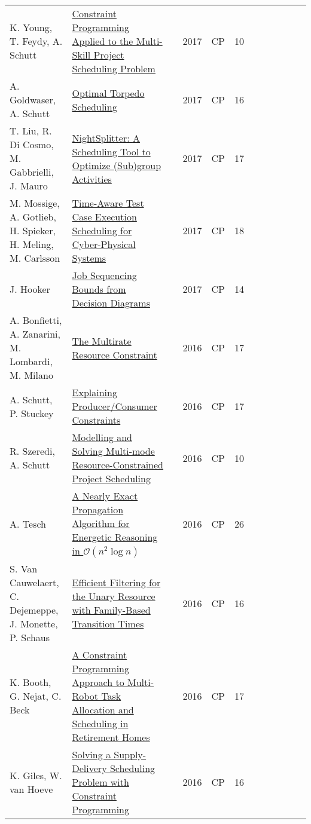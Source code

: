 {\begin{longtable}{p{3cm}p{6cm}rrcrlcccp{1.5cm}l}
K. Young, T. Feydy, A. Schutt& \href{papers/YoungFS17.pdf}{Constraint Programming Applied to the Multi-Skill Project Scheduling Problem} & \cite{YoungFS17} & 2017 & CP & 10 & & & & & & \\
A. Goldwaser, A. Schutt& \href{papers/GoldwaserS17.pdf}{Optimal Torpedo Scheduling} & \cite{GoldwaserS17} & 2017 & CP & 16 & & & & & & \\
T. Liu, R. Di Cosmo, M. Gabbrielli, J. Mauro& \href{papers/LiuCGM17.pdf}{NightSplitter: {A} Scheduling Tool to Optimize (Sub)group Activities} & \cite{LiuCGM17} & 2017 & CP & 17 & & & & & & \\
M. Mossige, A. Gotlieb, H. Spieker, H. Meling, M. Carlsson& \href{papers/MossigeGSMC17.pdf}{Time-Aware Test Case Execution Scheduling for Cyber-Physical Systems} & \cite{MossigeGSMC17} & 2017 & CP & 18 & & & & & & \\
J. Hooker & \href{papers/Hooker17.pdf}{Job Sequencing Bounds from Decision Diagrams} & \cite{Hooker17} & 2017 & CP & 14 & & & & & & \\
A. Bonfietti, A. Zanarini, M. Lombardi, M. Milano& \href{papers/BonfiettiZLM16.pdf}{The Multirate Resource Constraint} & \cite{BonfiettiZLM16} & 2016 & CP & 17 & & & & & & \\
A. Schutt, P. Stuckey& \href{papers/SchuttS16.pdf}{Explaining Producer/Consumer Constraints} & \cite{SchuttS16} & 2016 & CP & 17 & & & & & & \\
R. Szeredi, A. Schutt& \href{papers/SzerediS16.pdf}{Modelling and Solving Multi-mode Resource-Constrained Project Scheduling} & \cite{SzerediS16} & 2016 & CP & 10 & & & & & & \\
A. Tesch & \href{papers/Tesch16.pdf}{A Nearly Exact Propagation Algorithm for Energetic Reasoning in $\mathcal O(n^2 \log n)$} & \cite{Tesch16} & 2016 & CP & 26 & & & & & & \\
S. Van Cauwelaert, C. Dejemeppe, J. Monette, P. Schaus& \href{papers/CauwelaertDMS16.pdf}{Efficient Filtering for the Unary Resource with Family-Based Transition Times} & \cite{CauwelaertDMS16} & 2016 & CP & 16 & & & & & & \\
K. Booth, G. Nejat, C. Beck& \href{papers/BoothNB16.pdf}{A Constraint Programming Approach to Multi-Robot Task Allocation and Scheduling in Retirement Homes} & \cite{BoothNB16} & 2016 & CP & 17 & & & & & & \\
K. Giles, W. van Hoeve & \href{papers/GilesH16.pdf}{Solving a Supply-Delivery Scheduling Problem with Constraint Programming} & \cite{GilesH16} & 2016 & CP & 16 & & & & & & \\

\end{longtable}}
